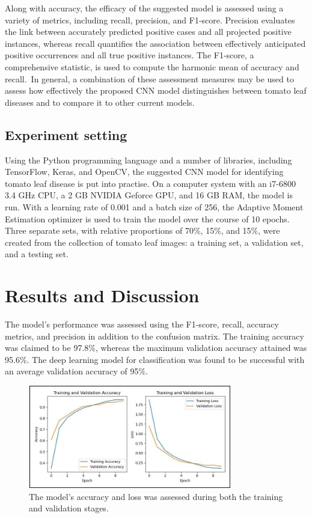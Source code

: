\documentclass[conference]{IEEEtran}
\begin{document}
Along with accuracy, the efficacy of the suggested model is assessed using a variety of metrics, including recall, precision, and F1-score. Precision evaluates the link between accurately predicted positive cases and all projected positive instances, whereas recall quantifies the association between effectively anticipated positive occurrences and all true positive instances. The F1-score, a comprehensive statistic, is used to compute the harmonic mean of accuracy and recall.\
In general, a combination of these assessment measures may be used to assess how effectively the proposed CNN model distinguishes between tomato leaf diseases and to compare it to other current models.




\subsection{Experiment setting} 
Using the Python programming language and a number of libraries, including TensorFlow, Keras, and OpenCV, the suggested CNN model for identifying tomato leaf disease is put into practise. On a computer system with an i7-6800 3.4 GHz CPU, a 2 GB NVIDIA Geforce GPU, and 16 GB RAM, the model is run. With a learning rate of 0.001 and a batch size of 256, the Adaptive Moment Estimation optimizer is used to train the model over the course of 10 epochs. Three separate sets, with relative proportions of 70\%, 15\%, and 15\%, were created from the collection of tomato leaf images: a training set, a validation set, and a testing set.


\section{Results and Discussion}

The model's performance was assessed using the F1-score, recall, accuracy metrics, and precision in addition to the confusion matrix. The training accuracy was claimed to be 97.8\%, whereas the maximum validation accuracy attained was 95.6\%. The deep learning model for classification was found to be successful with an average validation accuracy of 95\%.

 \begin{figure}[H]
 \includegraphics[width=8.9cm, height=4.5cm]{Tomato Accuracy and Loss.jpg}
\caption{The model's accuracy  and loss was assessed during both the training and validation stages.}
\label{fig: Figure 3}
\end{figure}
\end{document}
